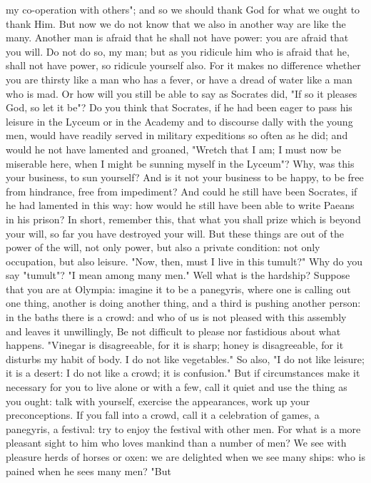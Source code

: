 \documentclass[a4paper]{article}
\begin{document}
my co-operation with others"; and so we should thank God for what we ought to
thank Him.
    But now we do not know that we also in another way are like the many.
Another man is afraid that he shall not have power: you are afraid that you
will. Do not do so, my man; but as you ridicule him who is afraid that he,
shall not have power, so ridicule yourself also. For it makes no difference
whether you are thirsty like a man who has a fever, or have a dread of water
like a man who is mad. Or how will you still be able to say as Socrates did,
"If so it pleases God, so let it be"? Do you think that Socrates, if he had
been eager to pass his leisure in the Lyceum or in the Academy and to discourse
dally with the young men, would have readily served in military expeditions so
often as he did; and would he not have lamented and groaned, "Wretch that I am;
I must now be miserable here, when I might be sunning myself in the Lyceum"?
Why, was this your business, to sun yourself? And is it not your business to be
happy, to be free from hindrance, free from impediment? And could he still have
been Socrates, if he had lamented in this way: how would he still have been
able to write Paeans in his prison?
    In short, remember this, that what you shall prize which is beyond your
will, so far you have destroyed your will. But these things are out of the
power of the will, not only power, but also a private condition: not only
occupation, but also leisure. "Now, then, must I live in this tumult?" Why do
you say "tumult"? "I mean among many men." Well what is the hardship? Suppose
that you are at Olympia: imagine it to be a panegyris, where one is calling out
one thing, another is doing another thing, and a third is pushing another
person: in the baths there is a crowd: and who of us is not pleased with this
assembly and leaves it unwillingly, Be not difficult to please nor fastidious
about what happens. "Vinegar is disagreeable, for it is sharp; honey is
disagreeable, for it disturbs my habit of body. I do not like vegetables." So
also, "I do not like leisure; it is a desert: I do not like a crowd; it is
confusion." But if circumstances make it necessary for you to live alone or
with a few, call it quiet and use the thing as you ought: talk with yourself,
exercise the appearances, work up your preconceptions. If you fall into a
crowd, call it a celebration of games, a panegyris, a festival: try to enjoy
the festival with other men. For what is a more pleasant sight to him who loves
mankind than a number of men? We see with pleasure herds of horses or oxen: we
are delighted when we see many ships: who is pained when he sees many men? "But
\end{document}
